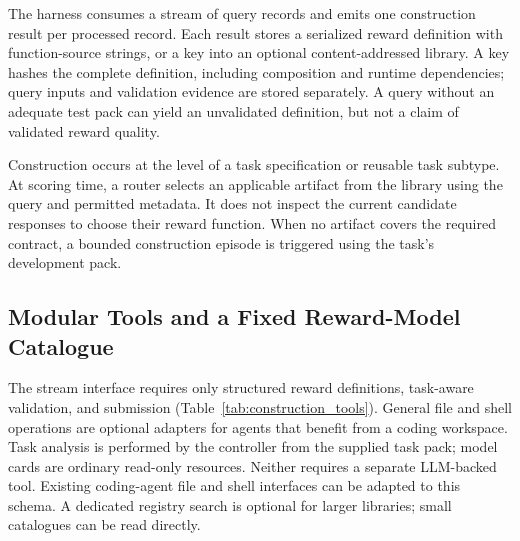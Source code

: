 The harness consumes a stream of query records and emits one construction result per processed record. Each result stores a serialized reward definition with function-source strings, or a key into an optional content-addressed library. A key hashes the complete definition, including composition and runtime dependencies; query inputs and validation evidence are stored separately. A query without an adequate test pack can yield an unvalidated definition, but not a claim of validated reward quality.

Construction occurs at the level of a task specification or reusable task subtype. At scoring time, a router selects an applicable artifact from the library using the query and permitted metadata. It does not inspect the current candidate responses to choose their reward function. When no artifact covers the required contract, a bounded construction episode is triggered using the task's development pack.

\subsection{Modular Tools and a Fixed Reward-Model Catalogue}
\label{sec:synthesis}

The stream interface requires only structured reward definitions, task-aware validation, and submission (Table~\ref{tab:construction_tools}). General file and shell operations are optional adapters for agents that benefit from a coding workspace. Task analysis is performed by the controller from the supplied task pack; model cards are ordinary read-only resources. Neither requires a separate LLM-backed tool. Existing coding-agent file and shell interfaces can be adapted to this schema. A dedicated registry search is optional for larger libraries; small catalogues can be read directly.

